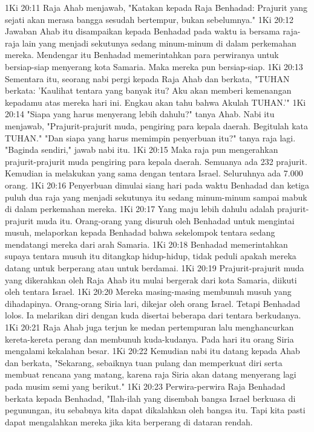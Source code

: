 1Ki 20:11  Raja Ahab menjawab, "Katakan kepada Raja Benhadad: Prajurit yang sejati akan merasa bangga sesudah bertempur, bukan sebelumnya."
1Ki 20:12  Jawaban Ahab itu disampaikan kepada Benhadad pada waktu ia bersama raja-raja lain yang menjadi sekutunya sedang minum-minum di dalam perkemahan mereka. Mendengar itu Benhadad memerintahkan para perwiranya untuk bersiap-siap menyerang kota Samaria. Maka mereka pun bersiap-siap.
1Ki 20:13  Sementara itu, seorang nabi pergi kepada Raja Ahab dan berkata, "TUHAN berkata: 'Kaulihat tentara yang banyak itu? Aku akan memberi kemenangan kepadamu atas mereka hari ini. Engkau akan tahu bahwa Akulah TUHAN.'"
1Ki 20:14  "Siapa yang harus menyerang lebih dahulu?" tanya Ahab. Nabi itu menjawab, "Prajurit-prajurit muda, pengiring para kepala daerah. Begitulah kata TUHAN." "Dan siapa yang harus memimpin penyerbuan itu?" tanya raja lagi. "Baginda sendiri," jawab nabi itu.
1Ki 20:15  Maka raja pun mengerahkan prajurit-prajurit muda pengiring para kepala daerah. Semuanya ada 232 prajurit. Kemudian ia melakukan yang sama dengan tentara Israel. Seluruhnya ada 7.000 orang.
1Ki 20:16  Penyerbuan dimulai siang hari pada waktu Benhadad dan ketiga puluh dua raja yang menjadi sekutunya itu sedang minum-minum sampai mabuk di dalam perkemahan mereka.
1Ki 20:17  Yang maju lebih dahulu adalah prajurit-prajurit muda itu. Orang-orang yang disuruh oleh Benhadad untuk mengintai musuh, melaporkan kepada Benhadad bahwa sekelompok tentara sedang mendatangi mereka dari arah Samaria.
1Ki 20:18  Benhadad memerintahkan supaya tentara musuh itu ditangkap hidup-hidup, tidak peduli apakah mereka datang untuk berperang atau untuk berdamai.
1Ki 20:19  Prajurit-prajurit muda yang dikerahkan oleh Raja Ahab itu mulai bergerak dari kota Samaria, diikuti oleh tentara Israel.
1Ki 20:20  Mereka masing-masing membunuh musuh yang dihadapinya. Orang-orang Siria lari, dikejar oleh orang Israel. Tetapi Benhadad lolos. Ia melarikan diri dengan kuda disertai beberapa dari tentara berkudanya.
1Ki 20:21  Raja Ahab juga terjun ke medan pertempuran lalu menghancurkan kereta-kereta perang dan membunuh kuda-kudanya. Pada hari itu orang Siria mengalami kekalahan besar.
1Ki 20:22  Kemudian nabi itu datang kepada Ahab dan berkata, "Sekarang, sebaiknya tuan pulang dan memperkuat diri serta membuat rencana yang matang, karena raja Siria akan datang menyerang lagi pada musim semi yang berikut."
1Ki 20:23  Perwira-perwira Raja Benhadad berkata kepada Benhadad, "Ilah-ilah yang disembah bangsa Israel berkuasa di pegunungan, itu sebabnya kita dapat dikalahkan oleh bangsa itu. Tapi kita pasti dapat mengalahkan mereka jika kita berperang di dataran rendah.
